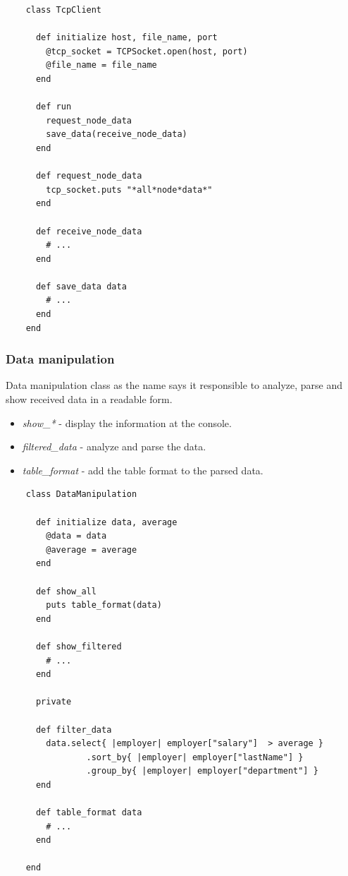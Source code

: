 \documentclass[12pt]{article}
\begin{document}
    \begin{lstlisting}
    class TcpClient

      def initialize host, file_name, port
        @tcp_socket = TCPSocket.open(host, port)
        @file_name = file_name
      end

      def run
        request_node_data
        save_data(receive_node_data)
      end

      def request_node_data
        tcp_socket.puts "*all*node*data*"
      end

      def receive_node_data
        # ...
      end

      def save_data data
        # ...
      end
    end
    \end{lstlisting}

    \subsubsection{Data manipulation}

    Data manipulation class as the name says it responsible to analyze,
    parse and show received data in a readable form.

    \begin{itemize}
      \renewcommand{\labelitemi}{$\circ$}
      \item \textit{show\_*} - display the information at the console.
      \item \textit{filtered\_data}  - analyze and parse the data.
      \item \textit{table\_format} - add the table format to the parsed data.
    \end{itemize}

    \begin{lstlisting}
    class DataManipulation

      def initialize data, average
        @data = data
        @average = average
      end

      def show_all
        puts table_format(data)
      end

      def show_filtered
        # ...
      end

      private

      def filter_data
        data.select{ |employer| employer["salary"]  > average }
                .sort_by{ |employer| employer["lastName"] }
                .group_by{ |employer| employer["department"] }
      end

      def table_format data
        # ...
      end

    end
    \end{lstlisting}
\end{document}

